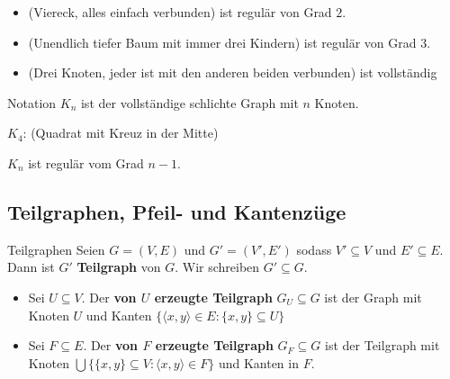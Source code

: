 \documentclass[12pt]{article}
\begin{document}
\begin{example}{}{}
    \begin{itemize}
        \item (Viereck, alles einfach verbunden) ist regulär von Grad $2$.
        \item (Unendlich tiefer Baum mit immer drei Kindern) ist regulär von Grad $3$.
        \item (Drei Knoten, jeder ist mit den anderen beiden verbunden) ist vollständig
    \end{itemize}
\end{example}

\begin{notebox}{Notation}{}
    $K_n$ ist der vollständige schlichte Graph mit $n$ Knoten.
\end{notebox}

\begin{example}{}{}
    $K_4$: (Quadrat mit Kreuz in der Mitte)
\end{example}

\begin{remark}{}{}
    $K_n$ ist regulär vom Grad $n-1$.
\end{remark}

\subsection{Teilgraphen, Pfeil- und Kantenzüge}

\begin{definition}{Teilgraphen}{}
    Seien $G = (V, E)$ und $G' = (V', E')$ sodass $V' \subseteq V$ und $E' \subseteq E$. Dann ist $G'$ \textbf{Teilgraph} von $G$. Wir schreiben $G' \subseteq G$.
    \begin{itemize}
        \item Sei $U \subseteq V$. Der \textbf{von $U$ erzeugte Teilgraph} $G_U \subseteq G$ ist der Graph mit Knoten $U$ und Kanten $\{\langle x, y \rangle \in E : \{x, y\} \subseteq U\}$
        \item Sei $F \subseteq E$. Der \textbf{von $F$ erzeugte Teilgraph} $G_F \subseteq G$ ist der Teilgraph mit Knoten $\bigcup \{\{x, y\} \subseteq V : \langle x, y \rangle \in F\}$ und Kanten in $F$.
    \end{itemize}
\end{definition}
\end{document}
